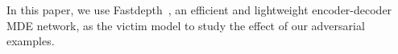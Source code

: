 \documentclass[10pt,twocolumn,letterpaper]{article}
\begin{document}
In this paper, we use Fastdepth~\cite{Wofk_2019_ICRA},
an efficient and lightweight encoder-decoder MDE network,
as the victim model to study the effect of our adversarial examples. 

\end{document}
